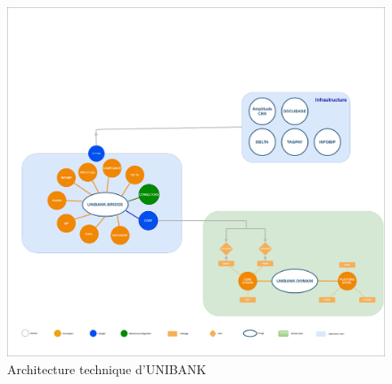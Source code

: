 \begin{figure}[!h]
    \centering %
        \includegraphics[width=16cm]{images/conception/architectureTechnique.png}
    \caption{Architecture technique d’UNIBANK}
\end{figure}
\newpage


